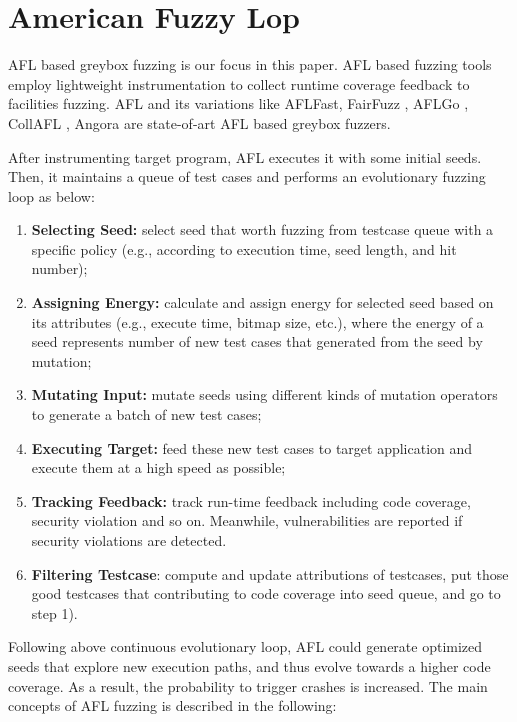 
\section{American Fuzzy Lop} \label{background}
AFL based greybox fuzzing is our focus in this paper. AFL based fuzzing tools employ lightweight instrumentation to collect runtime coverage feedback to facilities fuzzing. AFL\cite{afl} and its variations like AFLFast\cite{bohme2016aflfast}, FairFuzz \cite{fairfuzz}, AFLGo \cite{bohme2017aflgo}, CollAFL \cite{gancollafl}, Angora \cite{chen2013angora} are state-of-art AFL based greybox fuzzers. 

%


After instrumenting target program, AFL executes it with some initial seeds. Then, it maintains a queue of test cases and performs an evolutionary fuzzing loop as below:
\begin{enumerate}
\item \textbf{Selecting Seed:} select seed that worth fuzzing from testcase queue with a specific policy (e.g., according to execution time, seed length, and hit number); 
\item  \textbf{Assigning Energy:} calculate and assign energy for selected seed based on its attributes (e.g., execute time, bitmap size, etc.), where the energy of a seed represents number of new test cases that generated from the seed by mutation; 
\item  \textbf{Mutating Input:} mutate seeds using different kinds of mutation operators to generate a batch of new test cases;
\item  \textbf{Executing Target:} feed these new test cases to target application and execute them at a high speed as possible;
\item  \textbf{Tracking Feedback:} track run-time feedback including code coverage, security violation and so on. Meanwhile, vulnerabilities are reported if security violations are detected.
\item  \textbf{Filtering Testcase}: compute and update attributions of testcases, put those good testcases that contributing to code coverage into seed queue, and go to step 1).
\end{enumerate}


Following above continuous evolutionary loop, AFL could generate optimized seeds that explore new execution paths, and thus evolve towards a higher code coverage. As a result, the probability to trigger crashes is increased. The main concepts of AFL fuzzing is described in the following:
 
